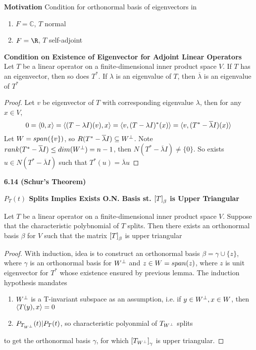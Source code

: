 \documentclass[11pt]{article}
\begin{document}
\begin{defn*}
    \textbf{Motivation} Condition for orthonormal basis of eigenvectors in 
    \begin{enumerate}
        \item $F = \mathbb{C}$, $T$ normal
        \item $F = \R$, $T$ self-adjoint
    \end{enumerate}
\end{defn*}

\begin{lemma*}
    \textbf{Condition on Existence of Eigenvector for Adjoint Linear Operators} Let $T$ be a linear operator on a finite-dimensional inner product space $V$. If $T$ has an eigenvector, then so does $T^*$. If $\lambda$ is an eigenvalue of $T$, then $\overline{\lambda}$ is an eigenvalue of $T^*$
    \begin{proof}
        Let $v$ be eigenvector of $T$ with corresponding eigenvalue $\lambda$, then for any $x\in V$,
        \[
            0 = \langle0,x\rangle = \langle(T-\lambda I)(v),x\rangle = \langle v,(T - \lambda I)^*(x)\rangle = \langle v,(T^* - \overline{\lambda} I)(x)\rangle
        \]
        Let $W = span(\{v\})$, so $R(T^* - \overline{\lambda}I) \subseteq W^{\perp}$. Note $rank(T^*-\overline{\lambda}I) \leq dim(W^{\perp}) = n-1$, then $N(T^* - \overline{\lambda}I) \neq \{0\}$. So exists $u\in N(T^* - \overline{\lambda}I)$ such that $T^*(u) = \overline{\lambda}u$
    \end{proof}
\end{lemma*}

\begin{theorem*}
    \textbf{6.14 (Schur's Theorem)}
    \begin{center}
        \textbf{$P_T(t)$ Splits Implies Exists O.N. Basis st. $\left[ T \right]_{\beta}$ is Upper Triangular}
    \end{center}
    Let $T$ be a linear operator on a finite-dimensional inner product space $V$. Suppose that the characteristic polybnomial of $T$ splits. Then there exists an orthonormal basis $\beta$ for $V$ such that the matrix $\left[ T \right]_{\beta}$ is upper triangular
    \begin{proof}
        With induction, idea is to construct an orthonormal basis $\beta = \gamma \cup \{z\}$, where $\gamma$ is an orthonormal basis for $W^{\perp}$ and $z\in W = span(z)$, where $z$ is unit eigenvector for $T^*$ whose existence ensured by previous lemma. The induction hypothesis mandates
        \begin{enumerate}
            \item $W^{\perp}$ is a T-invariant subspace as an assumption, i.e. if $y\in W^{\perp}, x\in W$, then $\langle T(y),x\rangle = 0$
            \item $P_{T_{W^{\perp}}}(t) | P_T(t)$, so characteristic polyonmial of $T_{W^{\perp}}$ splits
        \end{enumerate}
        to get the orthonormal basis $\gamma$, for which $\left[ T_{W^{\perp}} \right]_{\gamma}$ is upper triangular.
    \end{proof} 
\end{theorem*}
\end{document}
